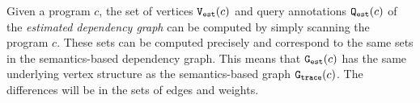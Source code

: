 %
%
Given a program $c$, the set of vertices $\mathtt{{V_{est}}}(c)$ and query annotations $\mathtt{{Q_{est}}}(c)$ of the \emph{estimated dependency graph} can be computed by simply
scanning the program $c$. These sets can be computed precisely and correspond to
the same sets in the semantics-based dependency graph.
This means that $\mathtt{{G_{est}}}(c)$ has the same underlying vertex structure as 
the semantics-based graph $\mathtt{{G_{trace}}}(c)$. The differences will be in the sets of edges and weights. 





\label{sec:alg_weightedgegen}
%
%

